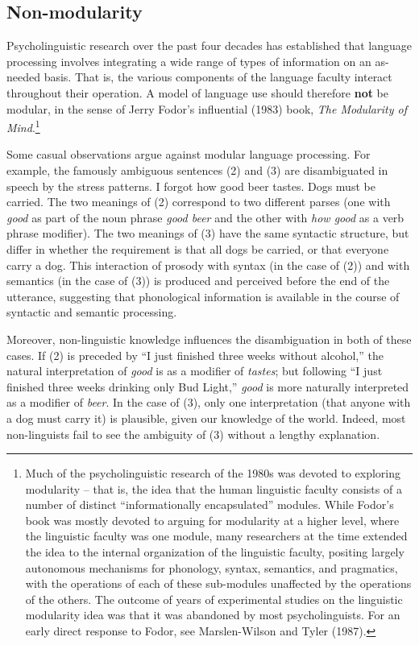 \documentclass[a4paper]{article}
\begin{document}
\subsection{Non-modularity}

Psycholinguistic research over the past four decades has established that language processing
involves integrating a wide range of types of information on an as-needed basis.  That is, the
various components of the language faculty interact throughout their operation.  A model of language
use should therefore {\bf not} be modular, in the sense of Jerry Fodor's influential (1983) book,
{\it The Modularity of Mind}.\footnote{%
  Much of the psycholinguistic research of the 1980s was devoted to exploring modularity -- that is, the idea that the human linguistic faculty consists of a number of distinct ``informationally encapsulated'' modules.  While Fodor's book was mostly devoted to arguing for modularity at a higher level, where the linguistic faculty was one module, many researchers at the time extended the idea to the internal organization of the linguistic faculty, positing largely autonomous mechanisms for phonology, syntax, semantics, and pragmatics, with the operations of each of these sub-modules unaffected by the operations of the others. The outcome of years of experimental studies on the linguistic modularity idea was that it was abandoned by most psycholinguists. For an early direct response to Fodor, see Marslen-Wilson and Tyler (1987).}

Some casual observations argue against modular language processing.  For example, the famously ambiguous sentences (2) and (3) are disambiguated in speech by the stress patterns.
\eal
\ex I forgot how good beer tastes.
\ex Dogs must be carried.
\zl
The two meanings of (2) correspond to two different parses (one with {\it good} as part of the noun phrase {\it good beer} and the other with {\it how good} as a verb phrase modifier).  The two meanings of (3) have the same syntactic structure, but differ in whether the requirement is that all dogs be carried, or that everyone carry a dog.  This interaction of prosody with syntax (in the case of (2)) and with semantics (in the case of (3)) is produced and perceived before the end of the utterance, suggesting that phonological information is available in the course of syntactic and semantic processing.  

Moreover, non-linguistic knowledge influences the disambiguation in both of these cases.  If (2) is preceded by ``I just finished three weeks without alcohol,'' the natural interpretation of {\it good} is as a modifier of {\it tastes}; but following ``I just finished three weeks drinking only Bud Light,'' {\it good} is more naturally interpreted as a modifier of {\it beer}.  In the case of (3), only one interpretation (that anyone with a dog must carry it) is plausible, given our knowledge of the world.  Indeed, most non-linguists fail to see the ambiguity of (3) without a lengthy explanation.  
\end{document}
